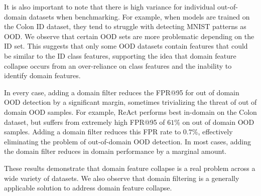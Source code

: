 \documentclass[letterpaper]{article} %
\theoremstyle{plain}
\theoremstyle{definition}
\theoremstyle{remark}
\begin{document}
It is also important to note that there is high variance for individual out-of-domain datasets when benchmarking. For example, when models are trained on the Colon ID dataset, they tend to struggle with detecting MNIST patterns as OOD. We observe that certain OOD sets are more problematic depending on the ID set. This suggests that only some OOD datasets contain features that could be similar to the ID class features, supporting the idea that domain feature collapse occurs from an over-reliance on class features and the inability to identify domain features. 

In every case, adding a domain filter reduces the FPR@95 for out of domain OOD detection by a significant margin, sometimes trivializing the threat of out of domain OOD samples. For example, ReAct performs best in-domain on the Colon dataset, but suffers from extremely high FPR@95 of $61$\% on out of domain OOD samples. Adding a domain filter reduces this FPR rate to $0.7$\%, effectively eliminating the problem of out-of-domain OOD detection. In most cases, adding the domain filter reduces in domain performance by a marginal amount. 

These results demonstrate that domain feature collapse is a real problem across a wide variety of datasets. We also observe that domain filtering is a generally applicable  solution to address domain feature collapse. %
\end{document}
